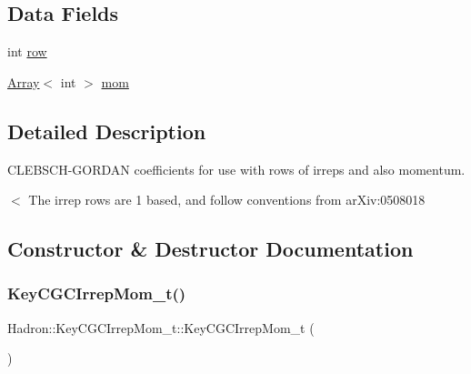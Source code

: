\subsection*{Data Fields}
\begin{DoxyCompactItemize}
\item 
int \mbox{\hyperlink{structHadron_1_1KeyCGCIrrepMom__t_a3e57507b9b7e870a9def2e18f4507875}{row}}
\item 
\mbox{\hyperlink{classXMLArray_1_1Array}{Array}}$<$ int $>$ \mbox{\hyperlink{structHadron_1_1KeyCGCIrrepMom__t_ac6136fa6ead6307922ff19950cacb083}{mom}}
\end{DoxyCompactItemize}


\subsection{Detailed Description}
C\+L\+E\+B\+S\+C\+H-\/\+G\+O\+R\+D\+AN coefficients for use with rows of irreps and also momentum. 

$<$ The irrep rows are 1 based, and follow conventions from ar\+Xiv\+:0508018 

\subsection{Constructor \& Destructor Documentation}
\mbox{\label{structHadron_1_1KeyCGCIrrepMom__t_aa3965e02d80a6c483de3e253a4de7826}} 
\subsubsection{\texorpdfstring{KeyCGCIrrepMom\_t()}{KeyCGCIrrepMom\_t()}\hspace{0.1cm}{\footnotesize\ttfamily [1/4]}}
{\footnotesize\ttfamily Hadron\+::\+Key\+C\+G\+C\+Irrep\+Mom\+\_\+t\+::\+Key\+C\+G\+C\+Irrep\+Mom\+\_\+t (\begin{DoxyParamCaption}{ }\end{DoxyParamCaption})\hspace{0.3cm}{\ttfamily [inline]}}

\mbox{\label{structHadron_1_1KeyCGCIrrepMom__t_a467e3ce4ab08bc6438ac855240bead31}} 
